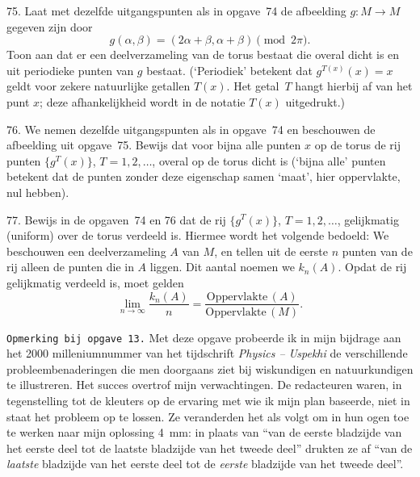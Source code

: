 \clearpage

\begin{problem}{75.}
	Laat met dezelfde uitgangspunten als in opgave~74 de afbeelding $g \colon M \to M$ gegeven zijn door
	\begin{equation*}
		g(\alpha,\beta) = (2 \alpha + \beta,\alpha + \beta) \pmod {2 \pi}.
	\end{equation*}
	Toon aan dat er een deelverzameling van de torus bestaat die overal dicht is en uit periodieke punten van $g$ bestaat. (`Periodiek' betekent dat $g^{T(x)}(x) = x$ geldt voor zekere natuurlijke getallen $T(x)$. Het getal~$T$ hangt hierbij af van het punt $x$; deze afhankelijkheid wordt in de notatie $T(x)$ uitgedrukt.)
\end{problem}

\begin{problem}{76.}
	We nemen dezelfde uitgangspunten als in opgave~74 en beschou\-wen de afbeelding uit opgave~75. Bewijs dat voor bijna alle punten $x$ op de torus de rij punten $\{g^T(x)\}$, $T = 1,2,\dotsc$, overal op de torus dicht is (`bijna alle' punten betekent dat de punten zonder deze eigenschap samen `maat', hier oppervlakte, nul hebben).
\end{problem}

\begin{problem}{77.}
	Bewijs in de opgaven~74 en 76 dat de rij $\{g^T(x)\}$, $T = 1,2,\dotsc$, gelijkmatig (uniform) over de torus verdeeld is. Hiermee wordt het volgende bedoeld: We beschouwen een deelverzameling $A$ van $M$, en tellen uit de eerste $n$ punten van de rij alleen de punten die in $A$ liggen. Dit aantal noemen we $k_n(A)$. Opdat de rij gelijkmatig verdeeld is, moet gelden
	\begin{equation*}
		\lim\limits_{n \to \infty} \frac{k_n(A)}{n} = \frac{\text{Oppervlakte}\,(A)}{\text{Oppervlakte}\,(M)}.
	\end{equation*}
\end{problem}

\vfill

\noindent \texttt{Opmerking bij opgave~13.} Met deze opgave probeerde ik in mijn bijdrage aan het 2000 milleniumnummer van het tijdschrift \textit{Physics -- Uspekhi} de verschillende probleembenaderingen die men doorgaans ziet bij wiskundigen en natuurkundigen te illustreren. Het succes over\-trof mijn verwachtingen. De redacteuren waren, in tegenstelling tot de kleuters op de ervaring met wie ik mijn plan baseerde, niet in staat het probleem op te lossen. Ze veranderden het als volgt om in hun ogen toe te werken naar mijn oplossing \SI{4}{\mm}: in plaats van ``van de eerste bladzijde van het eerste deel tot de laatste bladzijde van het tweede deel'' drukten ze af ``van de \textit{laatste} bladzijde van het eerste deel tot de \textit{eerste} bladzijde van het tweede deel''.

